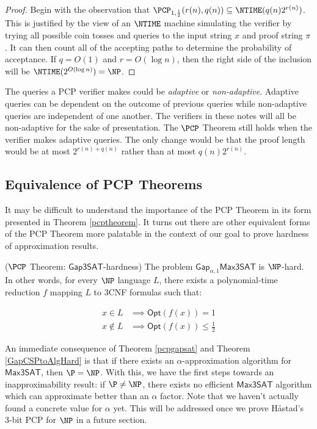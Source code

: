 \begin{proof}
Begin with the observation that $\PCP_{1,\frac{1}{2}}(r(n), q(n)) \subseteq \NTIME(q(n)2^{r(n)})$. This is justified by the view of an $\NTIME$ machine simulating the verifier by trying all possible coin tosses and queries to the input string $x$ and proof string $\pi$. It can then count all of the accepting paths to determine the probability of acceptance. If $q = O(1)$ and $r = O(\log{n})$, then the right side of the inclusion will be $\NTIME(2^{O(\log{n})}) = \NP$.
\end{proof}

\begin{remark}
  The queries a PCP verifier makes could be \emph{adaptive} or \emph{non-adaptive}. Adaptive queries can be dependent on the outcome of previous queries while non-adaptive queries are independent of one another. The verifiers in these notes will all be non-adaptive for the sake of presentation. The $\PCP$ Theorem still holds when the verifier makes adaptive queries. The only change would be that the proof length would be at most $2^{r(n) + q(n)}$ rather than at most $q(n)2^{r(n)}$.
\end{remark}


%
\subsection{Equivalence of PCP Theorems}
It may be difficult to understand the importance of the PCP Theorem in its form presented in Theorem \ref{pcptheorem}. It turns out there are other equivalent forms of the PCP Theorem more palatable in the context of our goal to prove hardness of approximation results.

\begin{theorem} \label{pcpgapsat}($\PCP$ Theorem: $\mathsf{Gap3SAT}$-hardness)
The problem $\mathsf{Gap}_{\alpha,1}\mathsf{Max3SAT}$ is $\NP$-hard. In other words, for every $\NP$ language $L$, there exists a polynomial-time reduction $f$ mapping $L$ to 3CNF formulas such that:

\begin{align*}
  x \in L & \implies \mathsf{Opt}(f(x)) = 1 \\
  x \not\in L & \implies \mathsf{Opt}(f(x)) \leq \frac{1}{2}
\end{align*}
\end{theorem}

An immediate consequence of Theorem \ref{pcpgapsat} and Theorem \ref{GapCSPtoAlgHard} is that if there exists an $\alpha$-approximation algorithm for $\mathsf{Max3SAT}$, then $\P = \NP$. With this, we have the first steps towards an inapproximability result: if $\P \neq \NP$, there exists no efficient $\mathsf{Max3SAT}$ algorithm which can approximate better than an $\alpha$ factor. Note that we haven't actually found a concrete value for $\alpha$ yet. This will be addressed once we prove H\aa stad's 3-bit PCP for $\NP$ in a future section.


